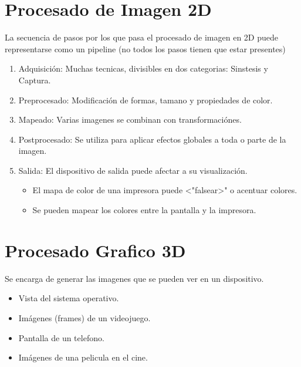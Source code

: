 \documentclass[12pt, twoside, openright]{report} %
\begin{document}
  \section{Procesado de Imagen 2D}
  La secuencia de pasos por los que pasa el procesado de imagen en 2D puede representarse como un pipeline (no todos los pasos tienen que estar presentes)

  \begin{enumerate}
      \item Adquisición: Muchas tecnicas, divisibles en dos categorias: Sinstesis y Captura.
    \item Preprocesado: Modificación de formas, tamano y propiedades de color.
    \item Mapeado: Varias imagenes se combinan con transformaciónes.
    \item Postprocesado: Se utiliza para aplicar efectos globales a toda o parte de la imagen.
    \item Salida: El dispositivo de salida puede afectar a su visualización.
      \begin{itemize}
        \item El mapa de color de una impresora puede <"falsear>" o acentuar colores.
        \item Se pueden mapear los colores entre la pantalla y la impresora.
      \end{itemize}
  \end{enumerate}

  \section{Procesado Grafico 3D}
  Se encarga de generar las imagenes que se pueden ver en un dispositivo.
\begin{itemize}
  \item Vista del sistema operativo.
  \item Imágenes (frames) de un videojuego.
  \item Pantalla de un telefono.
  \item Imágenes  de una pelicula en el cine.
\end{itemize}
\end{document}
